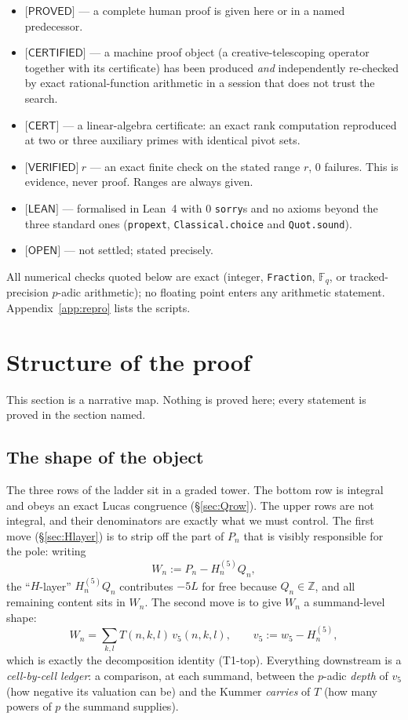 \documentclass[11pt,reqno]{amsart}
\theoremstyle{plain}
\theoremstyle{definition}
\theoremstyle{remark}
\numberwithin{equation}{section}
\newcommand{\ZZ}{\mathbb{Z}}
\newcommand{\FF}{\mathbb{F}}
\newcommand{\wfive}{w_5}
\newcommand{\vfive}{v_5}
\newcommand{\PROVED}{\textsf{[PROVED]}}
\newcommand{\VERIFIED}{\textsf{[VERIFIED]}}
\newcommand{\CERTIFIED}{\textsf{[CERTIFIED]}}
\newcommand{\CERT}{\textsf{[CERT]}}
\newcommand{\LEAN}{\textsf{[LEAN]}}
\newcommand{\OPEN}{\textsf{[OPEN]}}
\begin{document}
\begin{itemize}[leftmargin=1.6em]
\item $\PROVED$ --- a complete human proof is given here or in a named predecessor.
\item $\CERTIFIED$ --- a machine proof object (a creative-telescoping operator together with
  its certificate) has been produced \emph{and} independently re-checked by exact
  rational-function arithmetic in a session that does not trust the search.
\item $\CERT$ --- a linear-algebra certificate: an exact rank computation reproduced at two or
  three auxiliary primes with identical pivot sets.
\item $\VERIFIED\ r$ --- an exact finite check on the stated range $r$, $0$ failures. This is
  evidence, never proof. Ranges are always given.
\item $\LEAN$ --- formalised in Lean~4 with $0$ \texttt{sorry}s and no axioms beyond the three
  standard ones (\texttt{propext}, \texttt{Classical.choice} and \texttt{Quot.sound}).
\item $\OPEN$ --- not settled; stated precisely.
\end{itemize}

All numerical checks quoted below are exact (integer, \texttt{Fraction}, $\FF_q$, or tracked-precision
$p$-adic arithmetic); no floating point enters any arithmetic statement. Appendix~\ref{app:repro}
lists the scripts.

\section{Structure of the proof}\label{sec:structure}

This section is a narrative map. Nothing is proved here; every statement is proved in the
section named.

\subsection{The shape of the object}

The three rows of the ladder sit in a graded tower. The bottom row is integral and obeys an
exact Lucas congruence (\S\ref{sec:Qrow}). The upper rows are not integral, and their
denominators are exactly what we must control. The first move (\S\ref{sec:Hlayer}) is to strip
off the part of $P_n$ that is visibly responsible for the pole: writing
\[
W_n:=P_n-H^{(5)}_n Q_n,
\]
the ``$H$-layer'' $H^{(5)}_nQ_n$ contributes $-5L$ for free because $Q_n\in\ZZ$, and all
remaining content sits in $W_n$. The second move is to give $W_n$ a summand-level shape:
\[
W_n=\sum_{k,l}T(n,k,l)\,\vfive(n,k,l),\qquad \vfive:=\wfive-H^{(5)}_n,
\]
which is exactly the decomposition identity (T1-top). Everything downstream is a
\emph{cell-by-cell ledger}: a comparison, at each summand, between the $p$-adic \emph{depth}
of $\vfive$ (how negative its valuation can be) and the Kummer \emph{carries} of $T$ (how many
powers of $p$ the summand supplies).
\end{document}
